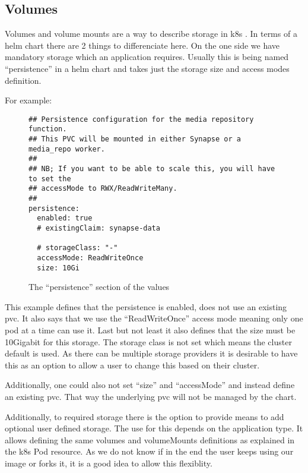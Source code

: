 \subsection{Volumes}

Volumes and volume mounts are a way to describe storage in \gls{k8s} .
In terms of a helm chart there are 2 things to differenciate here.
On the one side we have mandatory storage which an application requires.
Usually this is being named \enquote{persistence} in a helm chart and takes just the storage size and access modes definition.

For example:

\begin{figure}[h]
\begin{verbatim}
## Persistence configuration for the media repository function.
## This PVC will be mounted in either Synapse or a media_repo worker.
##
## NB; If you want to be able to scale this, you will have to set the
## accessMode to RWX/ReadWriteMany.
##
persistence:
  enabled: true
  # existingClaim: synapse-data

  # storageClass: "-"
  accessMode: ReadWriteOnce
  size: 10Gi
\end{verbatim}
\caption{The \enquote{persistence} section of the \gls{values}}\label{code:persistence_section}
\end{figure}

This example defines that the persistence is enabled, does not use an existing \Gls{pvc}.
It also says that we use the \enquote{ReadWriteOnce} access mode meaning only one pod at a time can use it\cite{KubernetesPersistentVolume}.
Last but not least it also defines that the size must be 10Gigabit for this storage.
The storage class is not set which means the cluster default is used. 
As there can be multiple storage providers it is desirable to have this as an option to allow a user to change this based on their cluster.

Additionally, one could also not set \enquote{size} and \enquote{accessMode} and instead define an existing \gls{pvc}.
That way the underlying \gls{pvc} will not be managed by the chart.
\bigskip

Additionally, to required storage there is the option to provide means to add optional user defined storage.
The use for this depends on the application type.
It allows defining the same volumes and volumeMounts definitions as explained in the \gls{k8s} Pod resource.
As we do not know if in the end the user keeps using our image or forks it, it is a good idea to allow this flexiblity.


